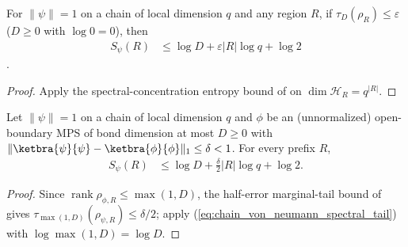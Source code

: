 \begin{lemma}
    \label{thm:chain_von_neumann_spectral_tail}
    \leanok
    For $\|\psi\|=1$ on a chain of local dimension $q$ and any region $R$, if
    $\tau_D(\rho_R)\le\varepsilon$ ($D\ge0$ with $\log0=0$), then
    \begin{align}
        \label{eq:chain_von_neumann_spectral_tail}
        S_\psi(R) & \le\log D+\varepsilon |R|\log q+\log2
    \end{align}
    \cite[lines 278--305]{Schuch2008EntropyScaling}.
\end{lemma}
\begin{proof}\leanok
    Apply the spectral-concentration entropy bound of
    \cite[``Spectral concentration and von Neumann entropy'']{QICLean2026Blueprint}
    on $\dim\mathcal H_R=q^{|R|}$.
\end{proof}

\begin{lemma}
    \label{thm:chain_von_neumann_prefix_error}
    \leanok
    Let $\|\psi\|=1$ on a chain of local dimension $q$ and $\phi$ be an
    (unnormalized) open-boundary MPS of bond dimension at most $D\ge0$ with
    $\|\ketbra{\psi}{\psi}-\ketbra{\phi}{\phi}\|_1\le\delta<1$. For every prefix
    $R$,
    \begin{align}
        \label{eq:chain_von_neumann_prefix_error}
        S_\psi(R) & \le\log D+\frac{\delta}{2}|R|\log q+\log2.
    \end{align}
\end{lemma}
\begin{proof}\leanok
    Since $\operatorname{rank}\rho_{\phi,R}\le\max(1,D)$, the half-error
    marginal-tail bound of
    \cite[``Discarded marginal spectrum at small pure-state error'']{QICLean2026Blueprint}
    gives $\tau_{\max(1,D)}(\rho_{\psi,R})\le\delta/2$; apply
    (\ref{eq:chain_von_neumann_spectral_tail}) with $\log\max(1,D)=\log D$.
\end{proof}

